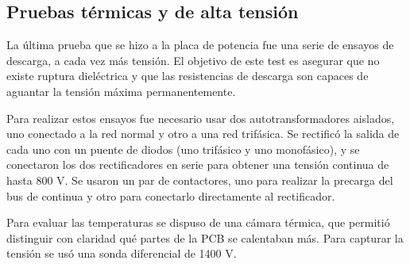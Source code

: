 \subsection{Pruebas térmicas y de alta tensión}

La última prueba que se hizo a la placa de potencia fue una serie de ensayos de descarga, a cada vez más tensión. El objetivo de este test es asegurar que no existe ruptura dieléctrica y que las resistencias de descarga son capaces de aguantar la tensión máxima permanentemente.

Para realizar estos ensayos fue necesario usar dos autotransformadores aislados, uno conectado a la red normal y otro a una red trifásica. Se rectificó la salida de cada uno con un puente de diodos (uno trifásico y uno monofásico), y se conectaron los dos rectificadores en serie para obtener una tensión continua de hasta 800 V. Se usaron un par de contactores, uno para realizar la precarga del bus de continua y otro para conectarlo directamente al rectificador.

Para evaluar las temperaturas se dispuso de una cámara térmica, que permitió distinguir con claridad qué partes de la PCB se calentaban más. Para capturar la tensión se usó una sonda diferencial de 1400 V.

